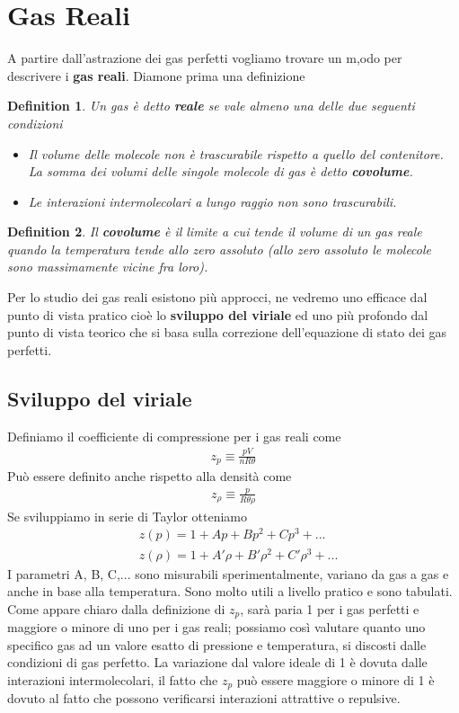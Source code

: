 \documentclass[10pt,a4paper]{article}
\newtheorem{definition}{Definition}
\begin{document}
\section{Gas Reali}
A partire dall'astrazione dei gas perfetti vogliamo trovare un m,odo per descrivere i \textbf{gas reali}. Diamone prima una definizione
\begin{definition}
Un gas è detto \textbf{reale} se vale almeno una delle due seguenti condizioni
\begin{itemize}
\item Il volume delle molecole non è trascurabile rispetto a quello del contenitore. La somma dei volumi delle singole molecole di gas è detto \textbf{covolume}.
\item Le interazioni intermolecolari a lungo raggio non sono trascurabili. 
\end{itemize}
\end{definition}
\begin{definition}
	Il \textbf{covolume} è il limite a cui tende il volume di un gas reale quando la temperatura tende allo zero assoluto (allo zero assoluto le molecole sono massimamente vicine fra loro).
\end{definition}
Per lo studio dei gas reali esistono più approcci, ne vedremo uno efficace dal punto di vista pratico cioè lo \textbf{sviluppo del viriale} ed uno più profondo dal punto di vista teorico che si basa sulla correzione dell'equazione di stato dei gas perfetti. 
\subsection{Sviluppo del viriale}
Definiamo il coefficiente di compressione per i gas reali come
\begin{align*} 
	z_p \equiv \frac{p V}{n R \theta}
\end{align*} 
Può essere definito anche rispetto alla densità come
\begin{align*} 
	z_{\rho} \equiv \frac{p}{R \theta \rho}
\end{align*} 
Se sviluppiamo in serie di Taylor otteniamo
\begin{align*} 
	&z(p) = 1 + Ap + Bp^2+Cp^3+...\\
	&z(\rho)= 1 + A'\rho + B'\rho^2+C'\rho^3+...
\end{align*} 
I parametri A, B, C,... sono misurabili sperimentalmente, variano da gas a gas e anche in base alla temperatura. Sono molto utili a livello pratico e sono tabulati. Come appare chiaro dalla definizione di $z_p$, sarà paria 1 per i gas perfetti e maggiore o minore di uno per i gas reali; possiamo così valutare quanto uno specifico gas ad un valore esatto di pressione e temperatura, si discosti dalle condizioni di gas perfetto. La variazione dal valore ideale di 1 è dovuta dalle interazioni intermolecolari, il fatto che $z_p$ può essere maggiore o minore di 1 è dovuto al fatto che possono verificarsi interazioni attrattive o repulsive. 
\end{document}
